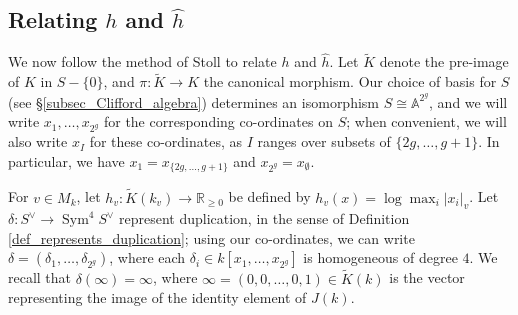 \documentclass{article} %
\numberwithin{equation}{section}
\DeclareMathOperator{\Sym}{Sym}
\newcommand{\A}{\mathbb{A}}
\newcommand{\R}{\mathbb{R}}
\begin{document}
\subsection{Relating $h$ and $\widehat{h}$}

We now follow the method of Stoll \cite{Sto99} to relate $h$ and $\widehat{h}$. Let $\widetilde{K}$ denote the pre-image of $K$ in $S - \{ 0 \}$, and $\pi : \widetilde{K} \to K$ the canonical morphism. Our choice of basis for $S$ (see \S \ref{subsec_Clifford_algebra}) determines an isomorphism $S \cong \A^{2^g}$, and we will write $x_1, \dots, x_{2^g}$ for the corresponding co-ordinates on $S$; when convenient, we will also write $x_I$ for these co-ordinates, as $I$ ranges over subsets of $\{ 2g, \dots, g+1 \}$. In particular, we have $x_1 = x_{\{ 2g, \dots, g+1 \}}$ and $x_{2^g} = x_\emptyset$.

For $v \in M_k$, let $h_v : \widetilde{K}(k_v) \to \R_{\geq 0}$ be defined by $h_v(x) = \log \max_i |x_i|_v$. Let $\delta : S^\vee \to \Sym^4 S^\vee$ represent duplication, in the sense of Definition \ref{def_represents_duplication}; using our co-ordinates, we can write $\delta = (\delta_1, \dots, \delta_{2^g})$, where each $\delta_i \in k[x_1, \dots, x_{2^g}]$ is homogeneous of degree $4$. We recall that $\delta(\infty) = \infty$, where $\infty = (0, 0, \dots, 0, 1) \in \widetilde{K}(k)$ is the vector representing the image of the identity element of $J(k)$. 
\end{document}
